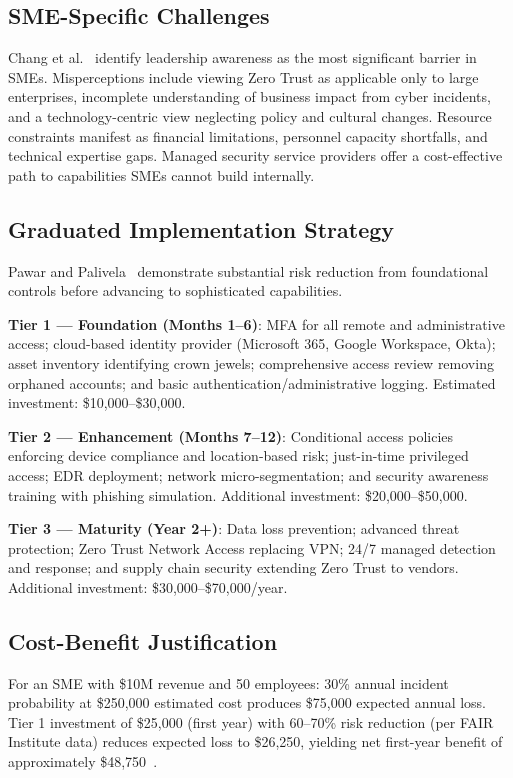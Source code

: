 \documentclass[journal]{IEEEtran}
\begin{document}
\subsection{SME-Specific Challenges}

Chang et al.~\cite{chang2025mind} identify leadership awareness as the most significant
barrier in SMEs. Misperceptions include viewing Zero Trust as applicable only to large
enterprises, incomplete understanding of business impact from cyber incidents, and a
technology-centric view neglecting policy and cultural changes. Resource constraints
manifest as financial limitations, personnel capacity shortfalls, and technical expertise
gaps. Managed security service providers offer a cost-effective path to capabilities SMEs
cannot build internally.

\subsection{Graduated Implementation Strategy}

Pawar and Palivela~\cite{pawar2023importance} demonstrate substantial risk reduction from
foundational controls before advancing to sophisticated capabilities.

\textbf{Tier 1 --- Foundation (Months 1--6)}: MFA for all remote and administrative
access; cloud-based identity provider (Microsoft 365, Google Workspace, Okta); asset
inventory identifying crown jewels; comprehensive access review removing orphaned
accounts; and basic authentication/administrative logging. Estimated investment:
\$10,000--\$30,000.

\textbf{Tier 2 --- Enhancement (Months 7--12)}: Conditional access policies enforcing
device compliance and location-based risk; just-in-time privileged access; EDR deployment;
network micro-segmentation; and security awareness training with phishing simulation.
Additional investment: \$20,000--\$50,000.

\textbf{Tier 3 --- Maturity (Year 2+)}: Data loss prevention; advanced threat protection;
Zero Trust Network Access replacing VPN; 24/7 managed detection and response; and supply
chain security extending Zero Trust to vendors. Additional investment:
\$30,000--\$70,000/year.

\subsection{Cost-Benefit Justification}

For an SME with \$10M revenue and 50 employees: 30\% annual incident probability at
\$250,000 estimated cost produces \$75,000 expected annual loss. Tier 1 investment of
\$25,000 (first year) with 60--70\% risk reduction (per FAIR Institute data) reduces
expected loss to \$26,250, yielding net first-year benefit of approximately
\$48,750~\cite{fairinstitute2025,campos2025safeguarding}.
\end{document}
